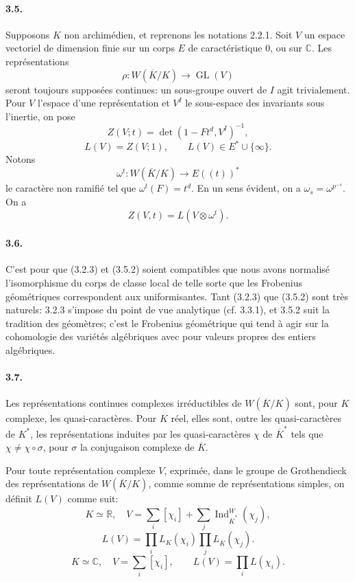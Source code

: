 \documentclass[10pt,letterpaper]{article}
\newcommand{\C}{\mathbb C}
\newcommand{\GL}{\operatorname{GL}}
\newcommand{\Ind}{\operatorname{Ind}}
\providecommand{\R}{\mathbb R}
\providecommand{\GL}{\operatorname{GL}}
\providecommand{\GL}{\operatorname{GL}}
\providecommand{\Ind}{\operatorname{Ind}}
\begin{document}
\paragraph{3.5.} Supposons \(K\) non archimédien, et reprenons les notations 2.2.1. Soit \(V\) un espace vectoriel de dimension finie sur un corps \(E\) de caractéristique \(0\), ou sur \(\C\). Les représentations
\[
\rho:W(\overline K/K)\longrightarrow\GL(V)
\]
seront toujours supposées continues: un sous-groupe ouvert de \(I\) agit trivialement. Pour \(V\) l'espace d'une représentation et \(V^I\) le sous-espace des invariants sous l'inertie, on pose
\[
\tag{3.5.1}
Z(V;t)=\det(1-Ft^d,V^I)^{-1},
\]
\[
\tag{3.5.2}
L(V)=Z(V;1),\qquad L(V)\in E^*\cup\{\infty\}.
\]
Notons
\[
\omega^t:W(\overline K/K)\longrightarrow E((t))^*
\]
le caractère non ramifié tel que \(\omega^t(F)=t^d\). En un sens évident, on a \(\omega_s=\omega^{p^{-s}}\). On a
\[
\tag{3.5.3}
Z(V,t)=L(V\otimes\omega^t).
\]

\paragraph{3.6.} C'est pour que (3.2.3) et (3.5.2) soient compatibles que nous avons normalisé l'isomorphisme du corps de classe local de telle sorte que les Frobenius géométriques correspondent aux uniformisantes. Tant (3.2.3) que (3.5.2) sont très naturels: 3.2.3 s'impose du point de vue analytique (cf. 3.3.1), et 3.5.2 suit la tradition des géomètres; c'est le Frobenius géométrique qui tend à agir sur la cohomologie des variétés algébriques avec pour valeurs propres des entiers algébriques.

\paragraph{3.7.} Les représentations continues complexes irréductibles de \(W(\overline K/K)\) sont, pour \(K\) complexe, les quasi-caractères. Pour \(K\) réel, elles sont, outre les quasi-caractères de \(K^*\), les représentations induites par les quasi-caractères \(\chi\) de \(\overline K^*\) tels que \(\chi\ne\chi\circ\sigma\), pour \(\sigma\) la conjugaison complexe de \(\overline K\).

Pour toute représentation complexe \(V\), exprimée, dans le groupe de Grothendieck des représentations de \(W(\overline K/K)\), comme somme de représentations simples, on définit \(L(V)\) comme suit:
\[
\tag{3.7.1}
K\simeq\R,\quad
V=\sum_i[\chi_i]+\sum_j\Ind_{\overline K^*}^{W}(\chi_j),
\]
\[
L(V)=\prod_i L_K(\chi_i)\prod_j L_{\overline K}(\chi_j).
\]
\[
\tag{3.7.2}
K\simeq\C,\quad V=\sum_i[\chi_i],
\qquad
L(V)=\prod_iL(\chi_i).
\]
\end{document}
